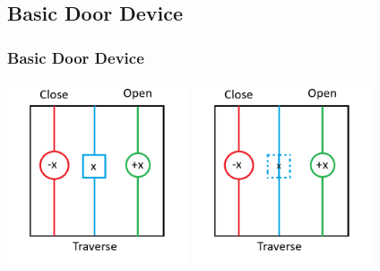 \documentclass{beamer}
\begin{document}
\subsection{Basic Door Device}
\begin{frame}
  \frametitle{Basic Door Device}
  \centerline{
    \includegraphics[width=0.40\textwidth]{res/doors/Door.png}
    \hspace{2.5cm}
    \includegraphics[width=0.40\textwidth]{res/doors/DoorOpend.png}
  }
\end{frame}
\end{document}
